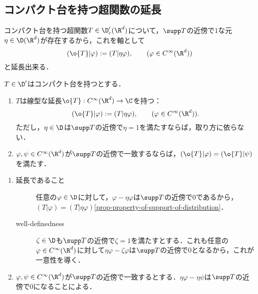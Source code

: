 \documentclass[uplatex,dvipdfmx]{jsreport}
\begin{document}
\subsection{コンパクト台を持つ超関数の延長}

\begin{tcolorbox}[colframe=ForestGreen, colback=ForestGreen!10!white,breakable,colbacktitle=ForestGreen!40!white,coltitle=black,fonttitle=\bfseries\sffamily,
title=]
    コンパクト台を持つ超関数$T\in\D'_c(\R^d)$について，$\supp T$の近傍で$1$な元$\eta\in\D(\R^d)$が存在するから，これを軸として
    \[(\o{T}|\varphi):=(T|\eta\varphi),\qquad(\varphi\in C^\infty(\R^d))\]
    と延長出来る．
\end{tcolorbox}

\begin{proposition}
    $T\in\D'$はコンパクト台を持つとする．
    \begin{enumerate}
        \item $T$は線型な延長$\o{T}:C^\infty(\R^d)\to\C$を持つ：
        \[(\o{T}|\varphi):=(T|\eta\varphi),\qquad(\varphi\in C^\infty(\R^d)).\]
        ただし，$\eta\in\D$は$\supp T$の近傍で$\eta=1$を満たすならば，取り方に依らない．
        \item $\varphi,\psi\in C^\infty(\R^d)$が$\supp T$の近傍で一致するならば，$(\o{T}|\varphi)=(\o{T}|\psi)$を満たす．
    \end{enumerate}
\end{proposition}
\begin{Proof}\mbox{}
    \begin{enumerate}
        \item 
        \begin{description}
            \item[延長であること] 任意の$\varphi\in\D$に対して，$\varphi-\eta\varphi$は$\supp T$の近傍で$0$であるから，$(T|\varphi)=(T|\eta\varphi)$\ref{prop-property-of-support-of-distribution}．
            \item[well-definedness] $\zeta\in\D$も$\supp T$の近傍で$\zeta=1$を満たすとする．これも任意の$\varphi\in C^\infty(\R^d)$に対して$\eta\varphi-\zeta\varphi$は$\supp T$の近傍で$0$となるから，これが一意性を導く．
        \end{description}
        \item $\varphi,\psi\in C^\infty(\R^d)$が$\supp T$の近傍で一致するとする．$\eta\varphi-\eta\psi$は$\supp T$の近傍で$0$になることによる．
    \end{enumerate}
\end{Proof}
\end{document}
